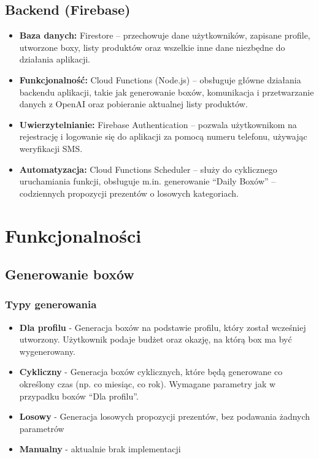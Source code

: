 \documentclass[a4paper, 12pt]{article}
\begin{document}
\subsection{Backend (Firebase)}
\begin{itemize}
    \item \textbf{Baza danych:} Firestore -- przechowuje dane użytkowników, zapisane profile, utworzone boxy, listy produktów oraz wszelkie inne dane niezbędne do działania aplikacji.
    \item \textbf{Funkcjonalność:} Cloud Functions (Node.js) -- obsługuje główne działania backendu aplikacji, takie jak generowanie boxów, komunikacja i przetwarzanie danych z OpenAI oraz pobieranie aktualnej listy produktów.
    \item \textbf{Uwierzytelnianie:} Firebase Authentication -- pozwala użytkownikom na rejestrację i logowanie się do aplikacji za pomocą numeru telefonu, używając weryfikacji SMS.
    \item \textbf{Automatyzacja:} Cloud Functions Scheduler -- służy do cyklicznego uruchamiania funkcji, obsługuje m.in. generowanie ``Daily Boxów'' -- codziennych propozycji prezentów o losowych kategoriach.
\end{itemize}

\newpage
\section{Funkcjonalności}
\subsection{Generowanie boxów}

\subsubsection{Typy generowania}
\begin{itemize}
    \item \textbf{Dla profilu} - Generacja boxów na podstawie profilu, który został wcześniej utworzony.
    Użytkownik podaje budżet oraz okazję, na którą box ma być wygenerowany.
    \item \textbf{Cykliczny} - Generacja boxów cyklicznych,
    które będą generowane co określony czas (np. co miesiąc, co rok).
    Wymagane parametry jak w przypadku boxów ``Dla profilu''.
    \item \textbf{Losowy} - Generacja losowych propozycji prezentów, bez podawania żadnych parametrów
    \item \textbf{Manualny} - aktualnie brak implementacji
\end{itemize}
\end{document}
